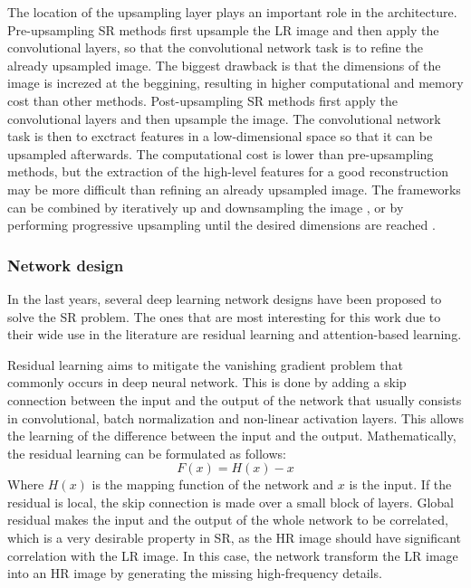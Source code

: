         The location of the upsampling layer plays an important role in the architecture. Pre-upsampling SR methods first upsample the LR image and then apply the convolutional layers, so that the convolutional network task is to refine the already upsampled image. The biggest drawback is that the dimensions of the image is increzed at the beggining, resulting in higher computational and memory cost than other methods.
        Post-upsampling SR methods first apply the convolutional layers and then upsample the image. The convolutional network task is then to exctract features in a low-dimensional space so that it can be upsampled afterwards. The computational cost is lower than pre-upsampling methods, but the extraction of the high-level features for a good reconstruction may be more difficult than refining an already upsampled image. 
        The frameworks can be combined by iteratively up and downsampling the image \cite{timofte2015seven}, or by performing progressive upsampling until the desired dimensions are reached \cite{lai2017deep}.

        \subsubsection{Network design}

        In the last years, several deep learning network designs have been proposed to solve the SR problem.  The ones that are most interesting for this work due to their wide use in the literature are residual learning and attention-based learning. 
        
        Residual learning aims to mitigate the vanishing gradient problem that commonly occurs in deep neural network. This is done by adding a skip connection between the input and the output of the network that usually consists in convolutional, batch normalization and non-linear activation layers. This allows the learning of the difference between the input and the output. Mathematically, the residual learning can be formulated as follows:
        \begin{equation}
            F(x) = H(x) - x
            \label{eq:2-residual-learning}
        \end{equation}
        Where $H(x)$ is the mapping function of the network and $x$ is the input. If the residual is local, the skip connection is made over a small block of layers. Global residual makes the input and the output of the whole network to be correlated, which is a very desirable property in SR, as the HR image should have significant correlation with the LR image. In this case, the network transform the LR image into an HR image by generating the missing high-frequency details. 
        
